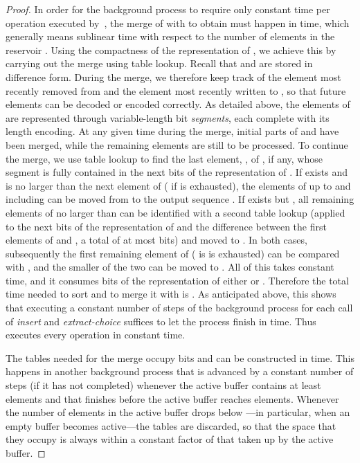 \documentclass[envcountsame,envcountsect,undated,nolinenumbers]{lnthi}
\def\Tvn#1{\hbox{\textit{#1\/}}}
\begin{document}
\begin{proof}
In order for the background process to require only
constant time per operation executed by~,
the merge of  with  to obtain
 must happen in  time, which
generally means sublinear time with
respect to the number of elements in the reservoir .
Using the compactness of the representation
of , we achieve this by carrying out the merge using table lookup.
Recall that  and  are stored in
difference form.
During the merge, we therefore
keep track of
the element most recently removed from  and the 
element most recently written to ,
so that future elements can be decoded or
encoded correctly.
As detailed above,
the elements of  are represented through
variable-length bit \emph{segments}, each
complete with its length encoding.
At any given time during the merge, initial parts of
 and  have been merged, while
the remaining elements are still to be processed.
To continue the merge, we use table lookup to
find the last element, , of , if any, whose segment
is fully contained in the next 
bits of the representation of .
If  exists and is no larger than the next
element  of 
( if  is exhausted), the elements of 
up to and including  can be moved from 
to the output sequence .
If  exists but , all remaining elements of 
no larger than  can be identified
with a second table lookup
(applied to the next  bits of
the representation of 
and the difference between the first elements
of  and , a total of at most
 bits)
and moved to .
In both cases, subsequently
the first remaining element of 
( is  is exhausted) can be
compared with , and the smaller of the two
can be moved to .
All of this takes constant time, and it consumes
 bits of the
representation of either  or .
Therefore the total time needed to sort
 and to merge it with  is .
As anticipated above, this shows that executing
a constant number of steps of the
background process for each call of
\Tvn{insert} and \Tvn{extract-choice}
suffices to let the process finish in time.
Thus  executes every operation in
constant time.

The tables needed for the merge occupy
 bits and can be constructed in
 time.
This happens
in another background process that is
advanced by a constant number of steps
(if it has not completed) whenever
the active buffer contains at least
 elements and that finishes before
the active buffer reaches  elements.
Whenever the number of elements in the
active buffer drops below ---in particular,
when an empty buffer becomes active---the tables
are discarded, so that the
space that they occupy is always within a
constant factor of that taken up by the active buffer.


\end{proof}
\end{document}
